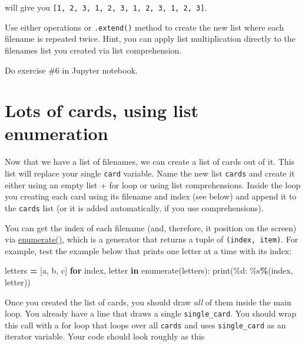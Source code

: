 \documentclass[
]{book}
\newenvironment{Shaded}{\begin{snugshade}}{\end{snugshade}}
\newcommand{\BuiltInTok}[1]{#1}
\newcommand{\ControlFlowTok}[1]{\textcolor[rgb]{0.13,0.29,0.53}{\textbf{#1}}}
\newcommand{\KeywordTok}[1]{\textcolor[rgb]{0.13,0.29,0.53}{\textbf{#1}}}
\newcommand{\NormalTok}[1]{#1}
\newcommand{\OperatorTok}[1]{\textcolor[rgb]{0.81,0.36,0.00}{\textbf{#1}}}
\newcommand{\SpecialCharTok}[1]{\textcolor[rgb]{0.00,0.00,0.00}{#1}}
\newcommand{\StringTok}[1]{\textcolor[rgb]{0.31,0.60,0.02}{#1}}
\begin{document}
will give you \texttt{{[}1,\ 2,\ 3,\ 1,\ 2,\ 3,\ 1,\ 2,\ 3,\ 1,\ 2,\ 3{]}}.

Use either operations or \texttt{.extend()} method to create the new list where each filename is repeated twice. Hint, you can apply list multiplication directly to the filenames list you created via list comprehension.

Do exercise \#6 in Jupyter notebook.

\hypertarget{lots-of-cards-using-list-enumeration}{%
\section{Lots of cards, using list enumeration}\label{lots-of-cards-using-list-enumeration}}

Now that we have a list of filenames, we can create a list of cards out of it. This list will replace your single \texttt{card} variable. Name the new list \texttt{cards} and create it either using an empty list + for loop or using list comprehensions. Inside the loop you creating each card using its filename and index (see below) and append it to the \texttt{cards} list (or it is added automatically, if you use comprehensions).

You can get the index of each filename (and, therefore, it position on the screen) via \href{https://docs.python.org/3/library/functions.html\#enumerate}{enumerate()}, which is a generator that returns a tuple of \texttt{(index,\ item)}. For example, test the example below that prints one letter at a time with its index:

\begin{Shaded}
\begin{Highlighting}[]
\NormalTok{letters }\OperatorTok{=}\NormalTok{ [}\StringTok{\textquotesingle{}a\textquotesingle{}}\NormalTok{, }\StringTok{\textquotesingle{}b\textquotesingle{}}\NormalTok{, }\StringTok{\textquotesingle{}c\textquotesingle{}}\NormalTok{]}
\ControlFlowTok{for}\NormalTok{ index, letter }\KeywordTok{in} \BuiltInTok{enumerate}\NormalTok{(letters):}
    \BuiltInTok{print}\NormalTok{(}\StringTok{\textquotesingle{}}\SpecialCharTok{\%d}\StringTok{: }\SpecialCharTok{\%s}\StringTok{\textquotesingle{}}\OperatorTok{\%}\NormalTok{(index, letter))}
\end{Highlighting}
\end{Shaded}

Once you created the list of cards, you should draw \emph{all} of them inside the main loop. You already have a line that draws a single \texttt{single\_card}. You should wrap this call with a for loop that loops over all \texttt{cards} and uses \texttt{single\_card} as an iterator variable. Your code should look roughly as this
\end{document}
